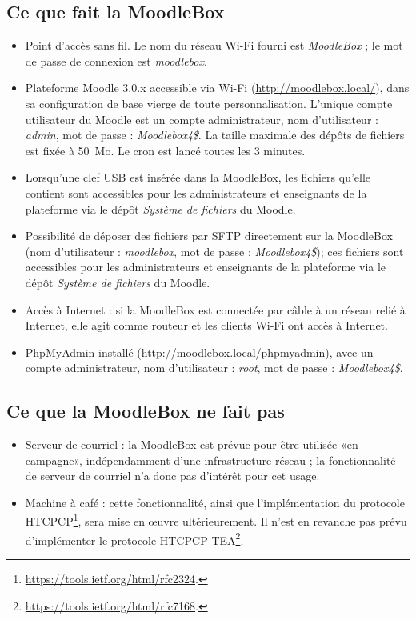 \documentclass[11pt]{article}
\begin{document}
\subsection{Ce que fait la MoodleBox}

\begin{itemize}
\item Point d'accès sans fil. Le nom du réseau Wi-Fi fourni est \emph{MoodleBox} ; le mot de passe de connexion est \emph{moodlebox}.
\item Plateforme Moodle 3.0.x accessible via Wi-Fi (\url{http://moodlebox.local/}), dans sa configuration de base vierge de toute personnalisation. L'unique compte utilisateur du Moodle est un compte administrateur, nom d'utilisateur : \emph{admin}, mot de passe : \emph{Moodlebox4\$}. La taille maximale des dépôts de fichiers est fixée à 50~Mo. Le cron est lancé toutes les 3 minutes.
\item Lorsqu'une clef USB est insérée dans la MoodleBox, les fichiers qu'elle contient sont accessibles pour les administrateurs et enseignants de la plateforme via le dépôt \emph{Système de fichiers} du Moodle.
\item Possibilité de déposer des fichiers par SFTP directement sur la MoodleBox (nom d'utilisateur : \emph{moodlebox}, mot de passe : \emph{Moodlebox4\$}); ces fichiers sont accessibles pour les administrateurs et enseignants de la plateforme via le dépôt \emph{Système de fichiers} du Moodle.
\item Accès à Internet : si la MoodleBox est connectée par câble à un réseau relié à Internet, elle agit comme routeur et les clients Wi-Fi ont accès à Internet.
\item PhpMyAdmin installé (\url{http://moodlebox.local/phpmyadmin}), avec un compte administrateur, nom d'utilisateur : \emph{root}, mot de passe : \emph{Moodlebox4\$}.
\end{itemize}

\subsection{Ce que la MoodleBox ne fait pas}

\begin{itemize}
\item Serveur de courriel : la MoodleBox est prévue pour être utilisée «en campagne», indépendamment d'une infrastructure réseau ; la fonctionnalité de serveur de courriel n'a donc pas d'intérêt pour cet usage.
\item Machine à café : cette fonctionnalité, ainsi que l'implémentation du protocole HTCPCP\footnote{\url{https://tools.ietf.org/html/rfc2324}.}, sera mise en œuvre ultérieurement. Il n'est en revanche pas prévu d'implémenter le protocole HTCPCP-TEA\footnote{\url{https://tools.ietf.org/html/rfc7168}.}.
\end{itemize}
\end{document}
